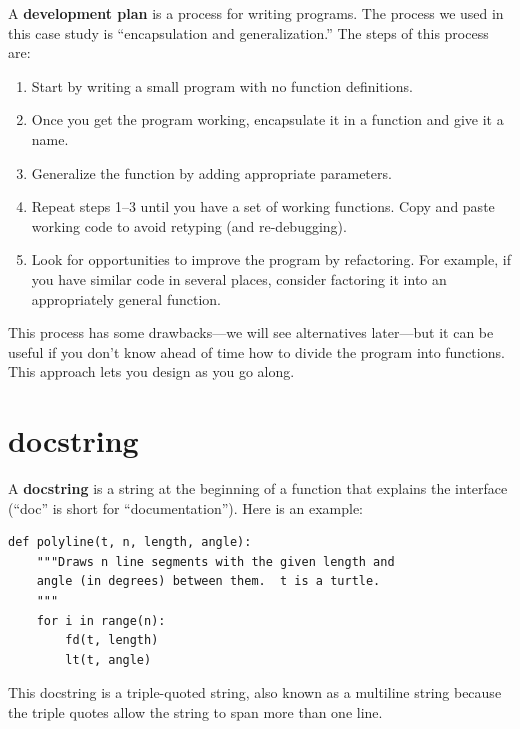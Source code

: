 \documentclass[10pt]{book}
\begin{document}
\begin{CJK}{UTF8}{gbsn}
A {\bf development plan} is a process for writing programs.
The process we used
in this case study is ``encapsulation and
generalization.''  The steps of this process are:

\begin{enumerate}

\item Start by writing a small program with no function definitions.

\item Once you get the program working, encapsulate it in a function
and give it a name.

\item Generalize the function by adding appropriate parameters.

\item Repeat steps 1--3 until you have a set of working functions.
Copy and paste working code to avoid retyping (and re-debugging).

\item Look for opportunities to improve the program by refactoring.
For example, if you have similar code in several places, consider
factoring it into an appropriately general function.

\end{enumerate}

This process has some drawbacks---we will see alternatives later---but
it can be useful if you don't know ahead of time how to divide the
program into functions.  This approach lets you design as you go
along.


\section{docstring}
\label{docstring}

A {\bf docstring} is a string at the beginning of a function that
explains the interface (``doc'' is short for ``documentation'').  Here
is an example:

\begin{verbatim}
def polyline(t, n, length, angle):
    """Draws n line segments with the given length and
    angle (in degrees) between them.  t is a turtle.
    """    
    for i in range(n):
        fd(t, length)
        lt(t, angle)
\end{verbatim}
%
This docstring is a triple-quoted string, also known
as a multiline string because the triple quotes allow the string
to span more than one line.


\end{CJK}
\end{document}
